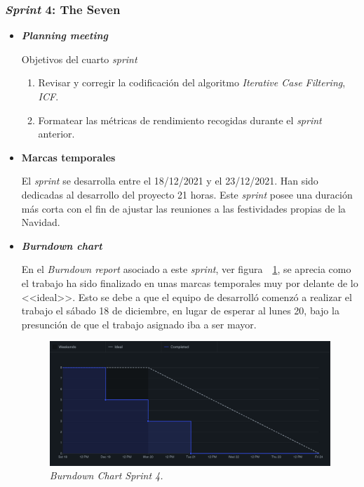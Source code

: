 \subsubsection{\textit{Sprint} 4: The Seven}
\begin{itemize}
\item \textbf{\textit{Planning meeting}}

Objetivos del cuarto \textit{sprint}
\begin{enumerate}
\item Revisar y corregir la codificación del algoritmo \textit{Iterative Case Filtering}, \textit{ICF}.
\item Formatear las métricas de rendimiento recogidas durante el \textit{sprint} anterior.
\end{enumerate}
\item \textbf{Marcas temporales}

El \textit{sprint} se desarrolla entre el 18/12/2021 y el 23/12/2021. Han sido dedicadas al desarrollo del proyecto 21 horas. Este \textit{sprint} posee una duración más corta con el fin de ajustar las reuniones a las festividades propias de la Navidad.

\item \textbf{\textit{Burndown chart}}

En el \textit{Burndown report} asociado a este \textit{sprint}, ver figura~~\ref{fig:BD-Sprint4}, se aprecia como el trabajo ha sido finalizado  en unas marcas temporales muy por delante de lo <<ideal>>. Esto se debe a que el equipo de desarrolló comenzó a realizar el trabajo el sábado 18 de diciembre, en lugar de esperar al lunes 20, bajo la presunción de que el trabajo asignado iba a ser mayor.
\begin{figure}
\begin{center}
\includegraphics[width=\textwidth]{../img/anexos/sprints/BD-Sprint4}
\caption{\textit{Burndown Chart Sprint 4.}}\label{fig:BD-Sprint4}
\end{center}
\end{figure}


\end{itemize}
